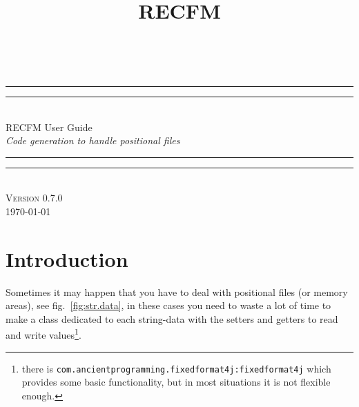 \documentclass[a4paper,10pt]{report}
\title{RECFM}
\begin{document}
\begin{titlepage}
\newlength{\drop}%
\textheight
\centering
\settowidth{\unitlength}{\large\itshape xxxCode generation to handle positional filesxx}
\vspace*{\baselineskip}
\\[\baselineskip]
\rule{\unitlength}{1.6pt}\vspace*{-\baselineskip}\vspace*{2pt}
\rule{\unitlength}{0.4pt}\\[\baselineskip]
{\Huge RECFM User Guide}\\[\baselineskip]
{\large\itshape Code generation to handle positional files}\\[0.2\baselineskip]
\rule{\unitlength}{0.4pt}\vspace*{-\baselineskip}\vspace{3.2pt}
\rule{\unitlength}{1.6pt}\\[\baselineskip]
\vfill
{\large\scshape Version 0.7.0}\\[\baselineskip]
{\small\scshape \today}\par
\vspace*{\drop}
\end{titlepage}


\section*{Introduction}
Sometimes it may happen that you have to deal with positional files (or memory 
areas), see fig.~\ref{fig:str.data}, in these cases you need to waste a lot of 
time to make a class dedicated to each string-data with the setters and getters
to read and write values\footnote{%
there is \texttt{com.ancientprogramming.fixedformat4j:fixedformat4j} 
which provides some basic functionality, but in most situations it is not 
flexible enough.}.
\end{document}
